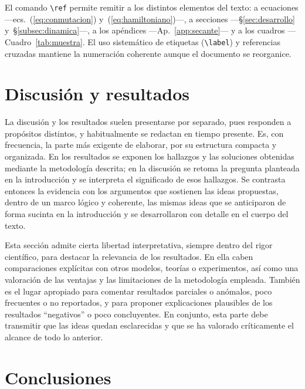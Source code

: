 \documentclass[11pt,letterpaper]{article}
\begin{document}
El comando \texttt{\textbackslash ref} permite remitir a los distintos elementos del
texto: a ecuaciones —ecs.~(\ref{eq:conmutacion}) y~(\ref{eq:hamiltoniano})—, a
secciones —\S\ref{sec:desarrollo} y~\S\ref{subsec:dinamica}—, a los apéndices
—Ap.~\ref{app:secante}— y a los cuadros —Cuadro~\ref{tab:muestra}. El uso sistemático
de etiquetas (\texttt{\textbackslash label}) y referencias cruzadas mantiene la
numeración coherente aunque el documento se reorganice.

\section{Discusión y resultados}\label{sec:resultados}

La discusión y los resultados suelen presentarse por separado, pues responden a
propósitos distintos, y habitualmente se redactan en tiempo presente. Es, con
frecuencia, la parte más exigente de elaborar, por su estructura compacta y
organizada. En los resultados se exponen los hallazgos y las soluciones obtenidas
mediante la metodología descrita; en la discusión se retoma la pregunta planteada en la
introducción y se interpreta el significado de esos hallazgos. Se contrasta entonces la
evidencia con los argumentos que sostienen las ideas propuestas, dentro de un marco
lógico y coherente, las mismas ideas que se anticiparon de forma sucinta en la
introducción y se desarrollaron con detalle en el cuerpo del texto.

Esta sección admite cierta libertad interpretativa, siempre dentro del rigor
científico, para destacar la relevancia de los resultados. En ella caben comparaciones
explícitas con otros modelos, teorías o experimentos, así como una valoración de las
ventajas y las limitaciones de la metodología empleada. También es el lugar apropiado
para comentar resultados parciales o anómalos, poco frecuentes o no reportados, y para
proponer explicaciones plausibles de los resultados ``negativos'' o poco concluyentes.
En conjunto, esta parte debe transmitir que las ideas quedan esclarecidas y que se ha
valorado críticamente el alcance de todo lo anterior.

\section{Conclusiones}\label{sec:conclusiones}
\end{document}
